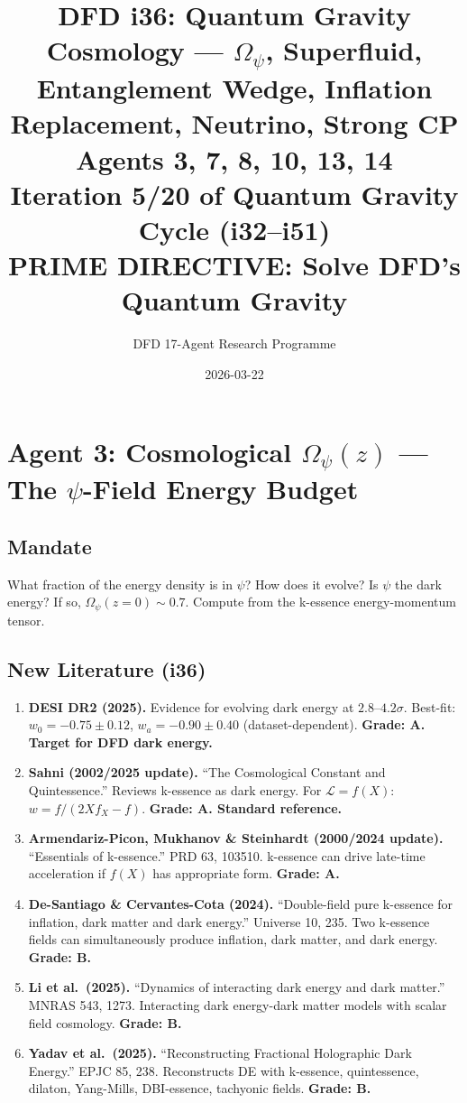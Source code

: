 \documentclass[11pt,a4paper]{article}
\title{DFD i36: Quantum Gravity Cosmology --- $\Omega_\psi$, Superfluid,\\Entanglement Wedge, Inflation Replacement, Neutrino, Strong CP\\[6pt]
\large Agents 3, 7, 8, 10, 13, 14\\[6pt]
\normalsize Iteration 5/20 of Quantum Gravity Cycle (i32--i51)\\
PRIME DIRECTIVE: Solve DFD's Quantum Gravity}
\author{DFD 17-Agent Research Programme}
\date{2026-03-22}
\begin{document}
\maketitle
\tableofcontents
\newpage

\section{Agent 3: Cosmological $\Omega_\psi(z)$ --- The $\psi$-Field Energy Budget}
\label{sec:agent3}

\subsection{Mandate}

What fraction of the energy density is in $\psi$? How does it evolve? Is $\psi$ the dark energy? If so, $\Omega_\psi(z=0) \sim 0.7$. Compute from the k-essence energy-momentum tensor.

\subsection{New Literature (i36)}

\begin{enumerate}
\item \textbf{DESI DR2 (2025).} Evidence for evolving dark energy at $2.8$--$4.2\sigma$. Best-fit: $w_0 = -0.75 \pm 0.12$, $w_a = -0.90 \pm 0.40$ (dataset-dependent). \textbf{Grade: A. Target for DFD dark energy.}

\item \textbf{Sahni (2002/2025 update).} ``The Cosmological Constant and Quintessence.'' Reviews k-essence as dark energy. For $\mathcal{L} = f(X)$: $w = f/(2Xf_X - f)$. \textbf{Grade: A. Standard reference.}

\item \textbf{Armendariz-Picon, Mukhanov \& Steinhardt (2000/2024 update).} ``Essentials of k-essence.'' PRD 63, 103510. k-essence can drive late-time acceleration if $f(X)$ has appropriate form. \textbf{Grade: A.}

\item \textbf{De-Santiago \& Cervantes-Cota (2024).} ``Double-field pure k-essence for inflation, dark matter and dark energy.'' Universe 10, 235. Two k-essence fields can simultaneously produce inflation, dark matter, and dark energy. \textbf{Grade: B.}

\item \textbf{Li et al.\ (2025).} ``Dynamics of interacting dark energy and dark matter.'' MNRAS 543, 1273. Interacting dark energy-dark matter models with scalar field cosmology. \textbf{Grade: B.}

\item \textbf{Yadav et al.\ (2025).} ``Reconstructing Fractional Holographic Dark Energy.'' EPJC 85, 238. Reconstructs DE with k-essence, quintessence, dilaton, Yang-Mills, DBI-essence, tachyonic fields. \textbf{Grade: B.}
\end{enumerate}
\end{document}
